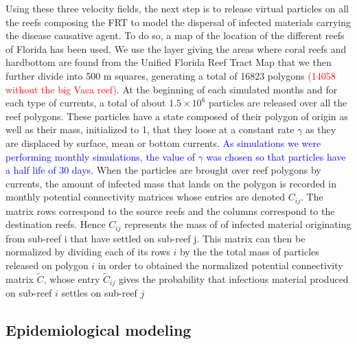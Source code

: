 \documentclass[utf8]{frontiersSCNS}
\begin{document}
Using these three velocity fields, the next step is to release virtual particles on all the reefs composing the FRT to model the dispersal of infected materials carrying the disease causative agent. To do so, a map of the location of the different reefs of Florida has been used. We use the layer giving the areas where coral reefs and hardbottom are found from the Unified Florida Reef Tract Map \citep{fwc2017unified} that we then further divide into 500 m squares, generating a total of 16823 polygons \textcolor{red}{(14058 without the big Vaca reef)}. At the beginning of each simulated months and for each type of currents, a total of about $1.5 \times 10^6$ particles are released over all the reef polygons. These particles have a state composed of their polygon of origin as well as their mass, initialized to 1, that they loose at a constant rate $\gamma$ as they are displaced by surface, mean or bottom currents. \textcolor{blue}{As simulations we were performing monthly simulations, the value of $\gamma$ was chosen so that particles have a half life of 30 days}. When the particles are brought over reef polygons by currents, the amount of infected mass that lands on the polygon is recorded in monthly potential connectivity matrices whose entries are denoted $C_{ij}$. The matrix rows correspond to the source reefs and the columns correspond to the destination reefs. Hence $C_{ij}$ represents the mass of of infected material originating from sub-reef i that have settled on sub-reef j. This matrix can then be normalized by dividing each of its rows $i$ by the the total mass of particles released on polygon $i$ in order to obtained the normalized potential connectivity matrix $\tilde{C}$, whose entry $\tilde{C}_{ij}$ gives the probability that infectious material produced on sub-reef $i$ settles on sub-reef $j$

\subsection{Epidemiological modeling}
\end{document}
